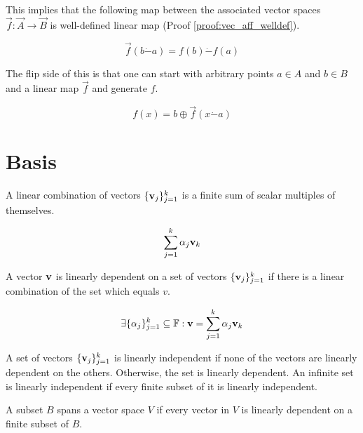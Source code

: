 This implies that the following map between the associated vector spaces $\overrightarrow{f}: \overrightarrow{A} \rightarrow \overrightarrow{B}$ is well-defined linear map (Proof \ref{proof:vec_aff_welldef}).

\begin{equation}
	\overrightarrow{f}(b \dot{-} a) = f(b) \dot{-} f(a)
\end{equation}

The flip side of this is that one can start with arbitrary points $a \in A$ and $b \in B$ and a linear map $\overrightarrow{f}$ and generate $f$.

\begin{equation}
	f(x) = b \oplus \overrightarrow{f}(x \dot{-} a)
\end{equation}

\section{Basis}

\begin{definition}
	A linear combination of vectors $\{ \vb{v}_{j} \}_{j = 1}^{k}$ is a finite sum of scalar multiples of themselves.
	
	\begin{equation}
		\sum_{j = 1}^{k} \alpha_{j} \vb{v}_{k}
	\end{equation}
\end{definition}

\begin{definition}
	A vector $\vb{v}$ is linearly dependent on a set of vectors $\{ \vb{v}_{j} \}_{j = 1}^{k}$ if there is a linear combination of the set which equals $v$.
	
	\begin{equation}
		\exists \{ \alpha_{j} \}_{j = 1}^{k} \subseteq \mathbb{F}: \vb{v} = \sum_{j = 1}^{k} \alpha_{j} \vb{v}_{k}
	\end{equation}
\end{definition}

\begin{definition}
	A set of vectors $\{ \vb{v}_{j} \}_{j = 1}^{k}$ is linearly independent if none of the vectors are linearly dependent on the others. Otherwise, the set is linearly dependent. An infinite set is linearly independent if every finite subset of it is linearly independent.
\end{definition}

\begin{definition}[Span]
A subset $B$ spans a vector space $V$ if every vector in $V$ is linearly dependent on a finite subset of $B$.
\end{definition}

